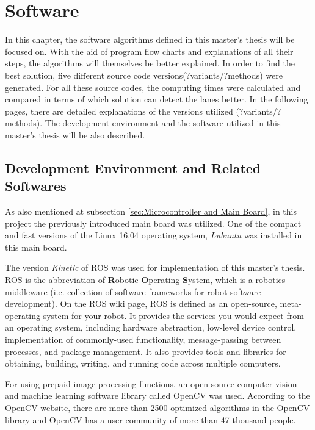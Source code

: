 %
\section{Software}\label{sec:Software}


In this chapter, the software algorithms defined in this master's thesis will be focused on. With the aid of program flow charts and explanations of all their steps, the algorithms will themselves be better explained. In order to find the best solution, five different source code versions(?variants/?methods) were generated. For all these source codes, the computing times were calculated and compared in terms of which solution can detect the lanes better. In the following pages, there are detailed explanations of the versions utilized (?variants/?methods). The development environment and the software utilized in this master's thesis will be also described.

%
\subsection{Development Environment and Related Softwares}
\label{sec:Development Environment and Related Softwares}

As also mentioned at subsection \ref{sec:Microcontroller and Main Board}, in this project the previously introduced main board was utilized. One of the compact and fast versions of the Linux 16.04 operating system, \textit{Lubuntu} was installed in this main board.

The version \textit{Kinetic} of ROS was used for implementation of this master's thesis. ROS is the abbreviation of \textbf{R}obotic \textbf{O}perating \textbf{S}ystem, which is a robotics middleware (i.e. collection of software frameworks for robot software development). On the ROS wiki page\cite{ROS}, ROS is defined as an open-source, meta-operating system for your robot. It provides the services you would expect from an operating system, including hardware abstraction, low-level device control, implementation of commonly-used functionality, message-passing between processes, and package management. It also provides tools and libraries for obtaining, building, writing, and running code across multiple computers.

For using prepaid image processing functions, an open-source computer vision and machine learning software library called OpenCV was used. According to the OpenCV website\cite{OpenCV}, there are more than 2500 optimized algorithms in the OpenCV library and OpenCV has a user community of more than 47 thousand people.

